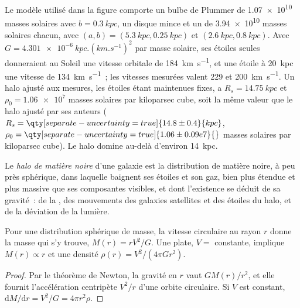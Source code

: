 Le modèle utilisé dans la figure comporte un bulbe de Plummer de
\num{1.07e10} masses solaires avec $b = \qty{0.3}{kpc}$, un disque mince et un
 de \num{3.94e10} masses solaires chacun, avec $(a, b) =
(\qty{5.3}{kpc}, \qty{0.25}{kpc})$ et $(\qty{2.6}{kpc}, \qty{0.8}{kpc})$.
Avec $G = \qty{4.301e-6}{kpc.(km.s^{-1})^2}$ par masse solaire, ses étoiles
seules donneraient au Soleil une vitesse orbitale de \qty{184}{km.s^{-1}}, et une
étoile à \qty{20}{kpc} une vitesse de \qty{134}{km.s^{-1}}~; les vitesses mesurées
valent 229 et \qty{200}{km.s^{-1}}. Un halo ajusté aux mesures, les étoiles étant
maintenues fixes, a $R_s = \qty{14.75}{kpc}$ et
$\rho_0 = \num{1.06e7}$ masses solaires par kiloparsec cube, soit la même valeur que
le halo ajusté par ses auteurs ($R_s = \qty[separate-uncertainty=true]{14.8 \pm 0.4}{kpc}$,
$\rho_0 = \qty[separate-uncertainty=true]{1.06 \pm 0.09 e7}{}$ masses solaires
par kiloparsec cube). Le halo domine au-delà d'environ \qty{14}{kpc}.

\begin{definition}\label{def:b3:milky-way-galaxies:halo}
Le \emph{halo de matière noire} d'une galaxie est la
distribution de matière noire, à peu près sphérique, dans laquelle baignent ses étoiles
et son gaz, bien plus étendue et plus massive que ses composantes visibles, et dont
l'existence se déduit de sa gravité~: de la , des mouvements
des galaxies satellites et des étoiles du halo, et de la déviation de la lumière.
\end{definition}

\begin{theorem}\label{thm:b3:milky-way-galaxies:enclosed}
Pour une distribution sphérique de masse, la vitesse circulaire au rayon $r$
donne la masse qui s'y trouve, $M(r) = rV^2/G$. Une  plate,
$V = $ constante, implique $M(r) \propto r$ et une densité
$\rho(r) = V^2/(4\pi G r^2)$.
\end{theorem}

\begin{proof}
Par le théorème de Newton, la gravité en $r$ vaut $GM(r)/r^2$, et elle fournit
l'accélération centripète $V^2/r$ d'une orbite circulaire. Si $V$ est constant,
$\mathrm{d}M/\mathrm{d}r = V^2/G = 4\pi r^2\rho$.
\end{proof}

